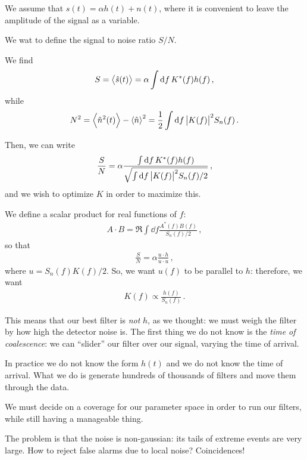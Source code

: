 \documentclass[main.tex]{subfiles}
\begin{document}
We assume that \(s(t) = \alpha h(t) + n(t)\), where it is convenient to leave the amplitude of the signal as a variable. 

We wat to define the signal to noise ratio \(S / N\). 

We find 
%
\begin{align}
S = \expval{\hat{s}(t)} = \alpha \int \dd{f} K^{*}(f) h(f)
\,,
\end{align}
%
while 
%
\begin{align}
N^2 = \expval{\hat{n}^2(t)} - \expval{\hat{n}}^2
= \frac{1}{2} \int \dd{f} \abs{K(f)}^2 S_n(f)
\,.
\end{align}

Then, we can write 
%
\begin{align}
\frac{S}{N} = \alpha \frac{\int \dd{f} K^{*} (f) h(f)}{\sqrt{\int \dd{f} \abs{K(f)}^2 S_n(f) / 2}}
\,,
\end{align}
%
and we wish to optimize \(K\) in order to maximize this. 

We define a scalar product for real functions of \(f\): 
%
\begin{align}
A \cdot B = \Re \int \dd{f} \frac{A^{*}(f) B(f)}{S_n (f) / 2}
\,,
\end{align}
%
so that 
%
\begin{align}
\frac{S}{N} = \alpha \frac{u \cdot h}{u \cdot u }
\,,
\end{align}
%
where \(u = S_n(f) K(f) / 2\).
So, we want \(u(f)\) to be parallel to \(h\): therefore, we want 
%
\begin{align}
K(f) \propto \frac{h(f)}{S_n(f)}
\,.
\end{align}
%

This means that our best filter is \emph{not} \(h\), as we thought: we must weigh the filter by how high the detector noise is. 
The first thing we do not know is the \emph{time of coalescence}: we can ``slider'' our filter over our signal, varying the time of arrival. 

In practice we do not know the form \(h(t)\) and we do not know the time of arrival. 
What we do is generate hundreds of thousands of filters and move them through the data.

We must decide on a coverage for our parameter space in order to run our filters, while still having a manageable thing. 

The problem is that the noise is non-gaussian: its tails of extreme events are very large.
How to reject false alarms due to local noise? Coincidences!
\end{document}
